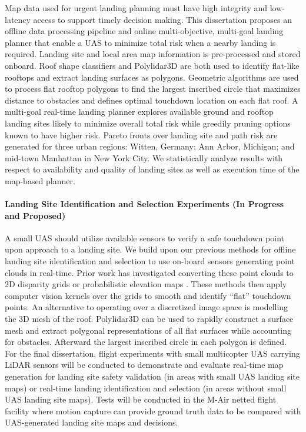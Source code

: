Map data used for urgent landing planning must have high integrity and low-latency access to support timely decision making. This dissertation proposes an offline data processing pipeline and online multi-objective, multi-goal landing planner that enable a UAS to minimize total risk when a nearby landing is required. Landing site and local area map information is pre-processed and stored onboard.  Roof shape classifiers and Polylidar3D are both used to identify flat-like rooftops and extract landing surfaces as polygons. Geometric algorithms are used to process flat rooftop polygons to find the largest inscribed circle that maximizes distance to obstacles and defines optimal touchdown location on each flat roof.  A multi-goal real-time landing planner explores available ground and rooftop landing sites likely to minimize overall total risk while greedily pruning options known to have higher risk.  Pareto fronts over landing site and path risk are generated for three urban regions: Witten, Germany; Ann Arbor, Michigan; and mid-town Manhattan in New York City. We statistically analyze results with respect to availability and quality of landing sites as well as execution time of the map-based planner.

\paragraph{Landing Site Identification and Selection Experiments (In Progress and Proposed)}

A small UAS should utilize available sensors to verify a safe touchdown point upon approach to a landing site. We build upon our previous methods for offline landing site identification and selection to  use on-board sensors generating point clouds in real-time. Prior work has investigated converting these point clouds to 2D disparity grids \cite{desaraju_vision-based_2015} or probabilistic elevation maps \cite{forster_continuous_2015}. These methods then apply computer vision kernels over the grids to smooth and identify ``flat'' touchdown points. 
An alternative to operating over a discretized image space is modelling the 3D mesh of the roof. Polylidar3D can be used to rapidly construct a surface mesh and extract polygonal representations of all flat surfaces while accounting for obstacles. Afterward the largest inscribed circle in each polygon is defined. For the final dissertation,  flight experiments with small multicopter UAS carrying LiDAR sensors will be conducted to demonstrate and evaluate real-time map generation for landing site safety validation (in areas with small UAS landing site maps) or real-time landing identification and selection (in areas without small UAS landing site maps). Tests will be conducted in the M-Air netted flight facility where motion capture can provide ground truth data to be compared with UAS-generated landing site maps and decisions. 


